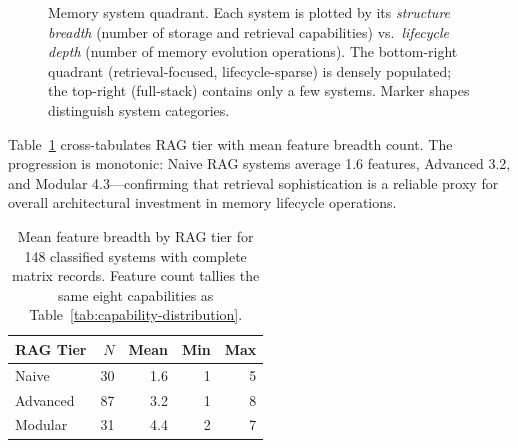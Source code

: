 \begin{figure}[!t]
\caption{Memory system quadrant.  Each system is plotted by its
\emph{structure breadth} (number of storage and retrieval capabilities) vs.\
\emph{lifecycle depth} (number of memory evolution operations).  The
bottom-right quadrant (retrieval-focused, lifecycle-sparse) is densely
populated; the top-right (full-stack) contains only a few systems.
Marker shapes distinguish system categories.}
\label{fig:quadrant}
\end{figure}

Table~\ref{tab:rag-breadth} cross-tabulates RAG tier with mean feature
breadth count.  The progression is monotonic: Naive RAG systems average
1.6 features, Advanced 3.2, and Modular 4.3---confirming that retrieval
sophistication is a reliable proxy for overall architectural investment
in memory lifecycle operations.

\begin{table}[!t]
\centering
\caption{Mean feature breadth by RAG tier for 148 classified systems
with complete matrix records.
Feature count tallies the same eight capabilities as
Table~\ref{tab:capability-distribution}.}
\label{tab:rag-breadth}
\small
\begin{tabular}{@{}lrrrr@{}}
\toprule
\textbf{RAG Tier} & \textbf{$N$} & \textbf{Mean} & \textbf{Min} & \textbf{Max} \\
\midrule
Naive    & 30 & 1.6 & 1 & 5 \\
Advanced & 87 & 3.2 & 1 & 8 \\
Modular  & 31 & 4.4 & 2 & 7 \\
\bottomrule
\end{tabular}
\end{table}

